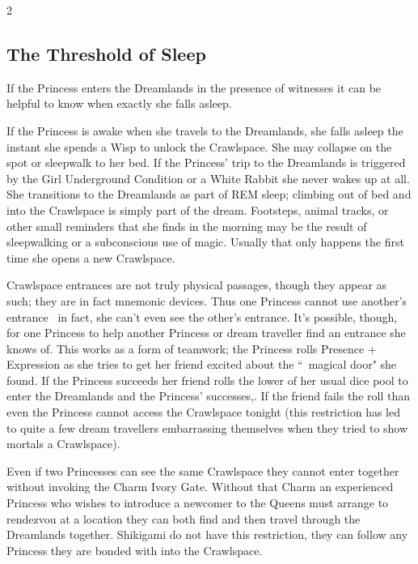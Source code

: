 \begin{multicols}{2}
\begin{mybox}

\subsection*{The Threshold of Sleep}

If the Princess enters the Dreamlands in the presence of witnesses it can be helpful to know when exactly she falls asleep.

If the Princess is awake when she travels to the Dreamlands, she falls asleep the instant she spends a Wisp to unlock the Crawlspace. She may collapse on the spot or sleepwalk to her bed. If the Princess' trip to the Dreamlands is triggered by the Girl Underground Condition or a White Rabbit she never wakes up at all. She transitions to the Dreamlands as part of REM sleep; climbing out of bed and into the Crawlspace is simply part of the dream. Footsteps, animal tracks, or other small reminders that she finds in the morning may be the result of sleepwalking or a subconscious use of magic. Usually that only happens the first time she opens a new Crawlspace.
\end{mybox}

Crawlspace entrances are not truly physical passages, though they appear as such; they are in fact mnemonic devices. Thus one Princess cannot use another's entrance \textendash\, in fact, she can't even see the other's entrance. It's possible, though, for one Princess to help another Princess or dream traveller find an entrance she knows of. This works as a form of teamwork; the Princess rolls Presence + Expression as she tries to get her friend excited about the \textquotedblleft\, magical door" she found. If the Princess succeeds her friend rolls the lower of her usual dice pool to enter the Dreamlands and the Princess' successes,. If the friend fails the roll than even the Princess cannot access the Crawlspace tonight (this restriction has led to quite a few dream travellers embarrassing themselves when they tried to show mortals a Crawlspace). 

Even if two Princesses can see the same Crawlspace they cannot enter together without invoking the Charm Ivory Gate. Without that Charm an experienced Princess who wishes to introduce a newcomer to the Queens must arrange to rendezvou at a location they can both find and then travel through the Dreamlands together. Shikigami do not have this restriction, they can follow any Princess they are bonded with into the Crawlspace. 


\end{multicols}
